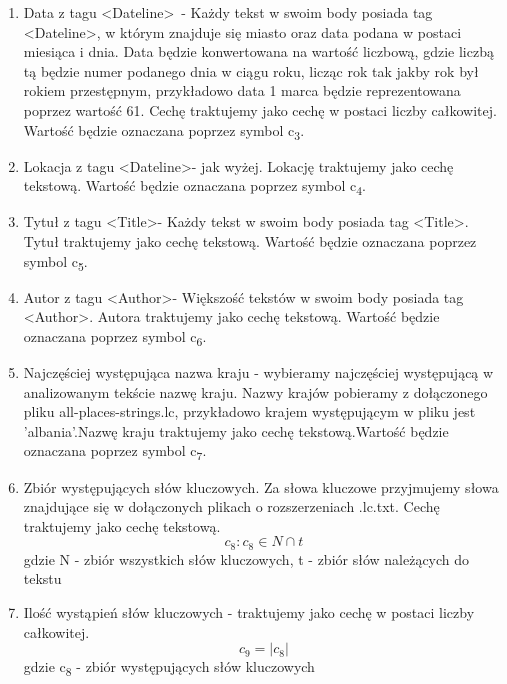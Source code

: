 \documentclass{classrep}
\begin{document}
\begin{enumerate}
 \item Data z tagu  \textless Dateline\textgreater\ - Każdy tekst w swoim body posiada tag \textless Dateline\textgreater , w którym znajduje się miasto oraz data podana w postaci miesiąca i dnia. Data będzie konwertowana na wartość liczbową, gdzie liczbą tą będzie numer podanego dnia w ciągu roku, licząc rok tak jakby rok był rokiem przestępnym, przykładowo data 1 marca będzie reprezentowana poprzez wartość 61. Cechę traktujemy jako cechę w postaci liczby całkowitej. Wartość będzie oznaczana poprzez symbol  c\textsubscript{3}.    \\
  \item Lokacja z tagu \textless Dateline\textgreater - jak wyżej. Lokację traktujemy jako cechę tekstową. Wartość będzie oznaczana poprzez symbol  c\textsubscript{4}. \\
  \item Tytuł z tagu \textless Title\textgreater - Każdy tekst w swoim body posiada tag \textless Title\textgreater. Tytuł traktujemy jako cechę tekstową. Wartość będzie oznaczana poprzez symbol  c\textsubscript{5}.\\
  \item Autor z tagu \textless Author\textgreater - Większość tekstów w swoim body posiada tag \textless Author\textgreater. Autora traktujemy jako cechę tekstową. Wartość będzie oznaczana poprzez symbol  c\textsubscript{6}.\\
  \item Najczęściej występująca nazwa kraju - wybieramy najczęściej występującą w analizowanym tekście nazwę kraju. Nazwy krajów pobieramy z dołączonego pliku all-places-strings.lc, przykładowo krajem występującym w pliku jest 'albania'.Nazwę kraju traktujemy jako cechę tekstową.Wartość będzie oznaczana poprzez symbol  c\textsubscript{7}.\\
  \item Zbiór występujących słów kluczowych. Za słowa kluczowe przyjmujemy słowa znajdujące się w dołączonych plikach o rozszerzeniach .lc.txt. Cechę traktujemy jako cechę tekstową.  \begin{equation}  c_8 : c_8 \in N \cap t \end{equation} gdzie N - zbiór wszystkich słów kluczowych, t - zbiór słów należących do tekstu\\
  \item Ilość wystąpień słów kluczowych - traktujemy jako cechę w postaci liczby całkowitej.\begin{equation}  c_9 = | c_8 | \end{equation} gdzie c\textsubscript{8} - zbiór występujących słów kluczowych\\

\end{enumerate}
\end{document}
